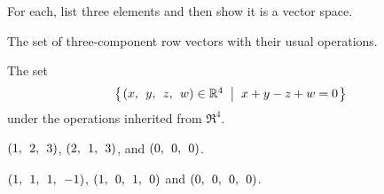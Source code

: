 
\begin{Exercise}[
name={},
title={}, 
difficulty=0,
origin={\cite{JH}}]
For each, list three elements and then show it is a vector space.

\Question The set of three-component row vectors with their usual
        operations.

\Question The set
        \begin{equation*}
          \set{\rowvec{x,& y,& z,& w} \in\Re^4\suchthat x+y-z+w=0}
        \end{equation*}
        under the operations inherited from $\Re^4$.
\end{Exercise}

\begin{Answer}
\Question $\rowvec{1,& 2,& 3}$, $\rowvec{2,& 1,& 3}$, and $\rowvec{0,& 0,& 0}$.

\Question $\rowvec{1,& 1,& 1,& -1}$, $\rowvec{1,& 0,& 1,& 0}$ and $\rowvec{0,& 0,& 0,& 0}$.

\end{Answer}
